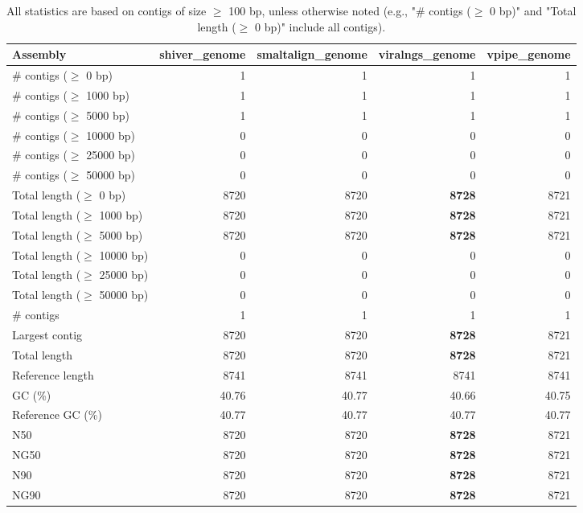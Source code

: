 \documentclass[12pt,a4paper]{article}
\begin{document}
\begin{table}[ht]
\begin{center}
\caption{All statistics are based on contigs of size $\geq$ 100 bp, unless otherwise noted (e.g., "\# contigs ($\geq$ 0 bp)" and "Total length ($\geq$ 0 bp)" include all contigs).}
\begin{tabular}{|l*{4}{|r}|}
\hline
Assembly & shiver\_genome & smaltalign\_genome & viralngs\_genome & vpipe\_genome \\ \hline
\# contigs ($\geq$ 0 bp) & 1 & 1 & 1 & 1 \\ \hline
\# contigs ($\geq$ 1000 bp) & 1 & 1 & 1 & 1 \\ \hline
\# contigs ($\geq$ 5000 bp) & 1 & 1 & 1 & 1 \\ \hline
\# contigs ($\geq$ 10000 bp) & 0 & 0 & 0 & 0 \\ \hline
\# contigs ($\geq$ 25000 bp) & 0 & 0 & 0 & 0 \\ \hline
\# contigs ($\geq$ 50000 bp) & 0 & 0 & 0 & 0 \\ \hline
Total length ($\geq$ 0 bp) & 8720 & 8720 & {\bf 8728} & 8721 \\ \hline
Total length ($\geq$ 1000 bp) & 8720 & 8720 & {\bf 8728} & 8721 \\ \hline
Total length ($\geq$ 5000 bp) & 8720 & 8720 & {\bf 8728} & 8721 \\ \hline
Total length ($\geq$ 10000 bp) & 0 & 0 & 0 & 0 \\ \hline
Total length ($\geq$ 25000 bp) & 0 & 0 & 0 & 0 \\ \hline
Total length ($\geq$ 50000 bp) & 0 & 0 & 0 & 0 \\ \hline
\# contigs & 1 & 1 & 1 & 1 \\ \hline
Largest contig & 8720 & 8720 & {\bf 8728} & 8721 \\ \hline
Total length & 8720 & 8720 & {\bf 8728} & 8721 \\ \hline
Reference length & 8741 & 8741 & 8741 & 8741 \\ \hline
GC (\%) & 40.76 & 40.77 & 40.66 & 40.75 \\ \hline
Reference GC (\%) & 40.77 & 40.77 & 40.77 & 40.77 \\ \hline
N50 & 8720 & 8720 & {\bf 8728} & 8721 \\ \hline
NG50 & 8720 & 8720 & {\bf 8728} & 8721 \\ \hline
N90 & 8720 & 8720 & {\bf 8728} & 8721 \\ \hline
NG90 & 8720 & 8720 & {\bf 8728} & 8721 \\ \hline

\end{tabular}
\end{center}
\end{table}
\end{document}
